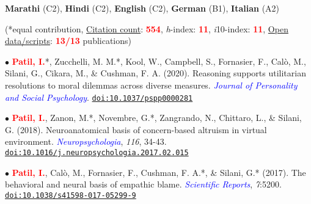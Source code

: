 \documentclass[10pt]{article}
\begin{document}
	

	\textbf{Marathi} (C2), \textbf{Hindi} (C2), \textbf{English} (C2), \textbf{German} (B1), \textbf{Italian} (A2)
	
	\begin{center}
	(*equal contribution, \href{https://scholar.google.it/citations?user=kSYuYTUAAAAJ&hl=en&oi=ao}{Citation count}: \textbf{\textcolor{red}{554}}, \textit{h}-index: \textbf{\textcolor{red}{11}}, \textit{i}10-index: \textbf{\textcolor{red}{11}}, \href{https://osf.io/hk5f3/}{Open data/scripts}: \textbf{\textcolor{red}{13/13}} publications)\\
	\end{center}

	$\bullet$ \textbf{\textcolor{red}{Patil, I.}}*, Zucchelli, M. M.*, Kool, W., Campbell, S., Fornasier, F., Cal\`{o}, M., Silani, G., Cikara, M., \& \hspace*{0.1in}Cushman, F. A. (2020). Reasoning supports utilitarian resolutions to moral dilemmas across diverse \hspace*{0.1in}measures. \textit{\textcolor{blue}{Journal of Personality and Social Psychology}}. \href{https://psyarxiv.com/q86vx/}{\tt doi:10.1037/pspp0000281}
	\miniskip
	
	$\bullet$ \textbf{\textcolor{red}{Patil, I.}}, Zanon, M.*, Novembre, G.*, Zangrando, N., Chittaro, L., \& Silani, G. (2018). Neuroanatomical \hspace*{0.1in}basis of concern-based altruism in virtual environment. \textit{\textcolor{blue}{Neuropsychologia}}, \textit{116}, 34-43. \hspace*{0.1in}\href{https://drive.google.com/open?id=0B6_u70YpdJKnWU0zblpBOUMxRXc}{\tt doi:10.1016/j.neuropsychologia.2017.02.015}
	\miniskip	
	
	$\bullet$ \textbf{\textcolor{red}{Patil, I.}}, Cal\`{o}, M., Fornasier, F., Cushman, F. A.*, \& Silani, G.* (2017). The behavioral and neural basis of \hspace*{0.1in}empathic blame. 
	\textit{\textcolor{blue}{Scientific Reports}}, \textit{7}:5200. \href{https://drive.google.com/open?id=0B6_u70YpdJKnT1J6dkk5R1NPZDg}{\tt doi:10.1038/s41598-017-05299-9}
	\miniskip
	
\end{document}
